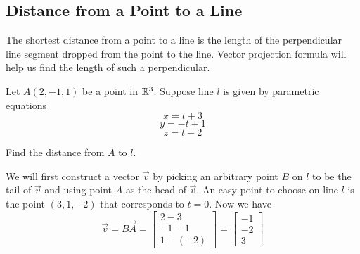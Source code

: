 \documentclass{ximera}
\begin{document}
\subsection*{Distance from a Point to a Line}

The shortest distance from a point to a line is the length of the perpendicular line segment dropped from the point to the line.  Vector projection formula will help us find the length of such a perpendicular.

\begin{example}\label{ex:distancefrompttoline}
Let $A(2, -1, 1)$ be a point in $\mathbb{R}^3$.  Suppose line $l$ is given by parametric equations $$x=t+3$$
$$y=-t+1$$
$$z=t-2$$

\begin{center}
\end{center}

Find the distance from $A$ to $l$.
\begin{explanation}
We will first construct a vector $\vec{v}$ by picking an arbitrary point $B$ on $l$ to be the tail of $\vec{v}$ and using point $A$ as the head of $\vec{v}$.  An easy point to choose on line $l$ is the point $(3, 1, -2)$ that corresponds to $t=0$.  Now we have 
$$\vec{v}=\overrightarrow{BA}=\begin{bmatrix}2-3\\-1-1\\1-(-2)\end{bmatrix}=\begin{bmatrix}-1\\-2\\3\end{bmatrix}$$

\begin{center}
\end{center}


\end{explanation}
\end{example}
\end{document}
